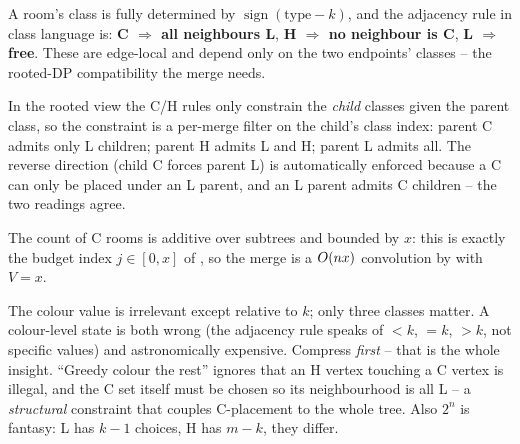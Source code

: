 \begin{observation}
A room's class is fully determined by $\operatorname{sign}(\text{type} - k)$,
and the adjacency rule in class language is: \textbf{C $\Rightarrow$ all
neighbours L}, \textbf{H $\Rightarrow$ no neighbour is C}, \textbf{L $\Rightarrow$
free}. These are edge-local and depend only on the two endpoints' classes -- the
rooted-DP compatibility the merge needs.
\end{observation}
\begin{observation}
In the rooted view the C/H rules only constrain the \emph{child} classes given
the parent class, so the constraint is a per-merge filter on the child's class
index: parent C admits only L children; parent H admits L and H; parent L
admits all. The reverse direction (child C forces parent L) is automatically
enforced because a C can only be placed under an L parent, and an L parent
admits C children -- the two readings agree.
\end{observation}
\begin{observation}
The count of C rooms is additive over subtrees and bounded by $x$: this is
exactly the budget index $j\in[0,x]$ of , so the merge is
a $O(nx)$ convolution by  with $V = x$.
\end{observation}

\begin{thinkbox}
{The colour value is irrelevant except relative to $k$; only three classes
matter. A colour-level state is both wrong (the adjacency rule speaks of
$<k$, $=k$, $>k$, not specific values) and astronomically expensive. Compress
\emph{first} -- that is the whole insight.}
{``Greedy colour the rest'' ignores that an H vertex touching a C vertex is
illegal, and the C set itself must be chosen so its neighbourhood is all L --
a \emph{structural} constraint that couples C-placement to the whole tree.
Also $2^n$ is fantasy: L has $k{-}1$ choices, H has $m{-}k$, they differ.}
\end{thinkbox}

